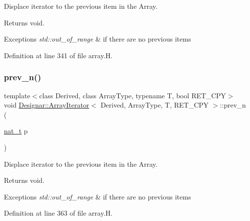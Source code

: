Displace iterator to the previous item in the Array. 

\begin{DoxyReturn}{Returns}
void. 
\end{DoxyReturn}

\begin{DoxyExceptions}{Exceptions}
{\em std\+::out\+\_\+of\+\_\+range} & if there are no previous items \\
\hline
\end{DoxyExceptions}


Definition at line 341 of file array.\+H.

\mbox{\label{class_designar_1_1_array_iterator_a5a417cab0b0b039c69d5a52a513a019f}} 
\subsubsection{\texorpdfstring{prev\+\_\+n()}{prev\_n()}}
{\footnotesize\ttfamily template$<$class Derived, class Array\+Type, typename T, bool R\+E\+T\+\_\+\+C\+PY$>$ \\
void \hyperlink{class_designar_1_1_array_iterator}{Designar\+::\+Array\+Iterator}$<$ Derived, Array\+Type, T, R\+E\+T\+\_\+\+C\+PY $>$\+::prev\+\_\+n (\begin{DoxyParamCaption}\item[{\hyperlink{namespace_designar_aa72662848b9f4815e7bf31a7cf3e33d1}{nat\+\_\+t}}]{p }\end{DoxyParamCaption})\hspace{0.3cm}{\ttfamily [inline]}}



Displace iterator to the previous item in the Array. 

\begin{DoxyReturn}{Returns}
void. 
\end{DoxyReturn}

\begin{DoxyExceptions}{Exceptions}
{\em std\+::out\+\_\+of\+\_\+range} & if there are no previous items \\
\hline
\end{DoxyExceptions}


Definition at line 363 of file array.\+H.

\mbox{\label{class_designar_1_1_array_iterator_af8781369a1cb13f92c8c2dbab9975118}} 
